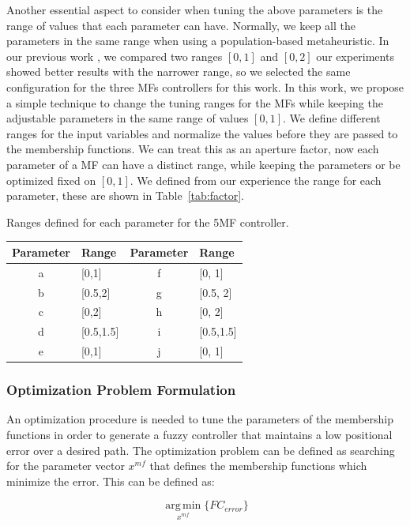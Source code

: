 \documentclass[symmetry,article,submit,moreauthors,pdftex]{Definitions/mdpi}
\begin{document}
Another essential aspect to consider when tuning the above parameters is the
range of values that each parameter can have. Normally, we keep all the
parameters in the same range when using a population-based metaheuristic. In
our previous work \cite{Mancilla2021}, we compared two ranges  
$[0,1]$ and $[0,2]$ our experiments showed better results with the
narrower range, so we selected the same configuration for the three MFs
controllers for this work. In this work, we propose a simple technique to
change the tuning ranges for the MFs while keeping the adjustable parameters in
the same range of values $[0,1]$. We define different ranges for the input
variables and normalize the values before they are passed to the membership
functions. We can treat this as an aperture factor, now each parameter of 
a MF can have a distinct range, while keeping the parameters or be optimized 
fixed on $[0,1]$. We defined from our experience the range for each parameter, these 
are shown in Table~\ref{tab:factor}.

\begin{specialtable}[H] 
\small
\caption{Ranges defined for each parameter for the 5MF controller.}\label{tab:factor}
\begin{tabular}{clcl}
\toprule
\textbf{Parameter}	& \textbf{Range}& \textbf{Parameter} & \textbf{Range}\\
\midrule
a & [0,1]			& f & [0, 1]\\
b & [0.5,2]			& g & [0.5, 2]\\
c & [0,2]			& h & [0, 2]\\
d & [0.5,1.5]		& i & [0.5,1.5]\\
e & [0,1]			& j & [0, 1]\\
\bottomrule
\end{tabular}
\end{specialtable}

\subsubsection{Optimization Problem Formulation}

An optimization procedure is needed to tune the parameters of the 
membership functions in order to generate a fuzzy controller that maintains 
a low positional error over a desired path. The optimization problem 
can be defined as searching for the parameter vector $x^{mf}$ that defines the membership functions 
which minimize  the error. This can be defined as: 

\begin{equation}
    \operatorname*{arg\,min}_{x^{mf}} \{ FC_{error}\}
\end{equation}
\end{document}

